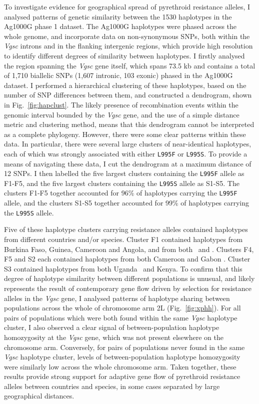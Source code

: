 \begin{refsection}
To investigate evidence for geographical spread of pyrethroid resistance alleles, I analysed patterns of genetic similarity between the 1530 haplotypes in the Ag1000G phase 1 dataset.
%
The Ag1000G haplotypes were phased across the whole genome, and incorporate data on non-synonymous SNPs, both within the \textit{Vgsc} introns and in the flanking intergenic regions, which provide high resolution to identify different degrees of similarity between haplotypes.
%
I firstly analysed the region spanning the \textit{Vgsc} gene itself, which spans 73.5 kb and contains a total of 1,710 biallelic SNPs (1,607 intronic, 103 exonic) phased in the Ag1000G dataset.
%
I performed a hierarchical clustering of these haplotypes, based on the number of SNP differences between them, and constructed a dendrogram, shown in Fig.~\ref{fig:hapclust}.
%
The likely presence of recombination events within the genomic interval bounded by the \textit{Vgsc} gene, and the use of a simple distance metric and clustering method, means that this dendrogram cannot be interpreted as a complete phylogeny.
%
However, there were some clear patterns within these data.
%
In particular, there were several large clusters of near-identical haplotypes, each of which was strongly associated with either \texttt{L995F} or \texttt{L995S}.
%
To provide a means of navigating these data, I cut the dendrogram at a maximum distance of 12 SNPs.
%
I then labelled the five largest clusters containing the \texttt{L995F} allele as F1-F5, and the five largest clusters containing the \texttt{L995S} allele as S1-S5.
%
The clusters F1-F5 together accounted for 96\% of haplotypes carrying the \texttt{L995F} allele, and the clusters S1-S5 together accounted for 99\% of haplotypes carrying the \texttt{L995S} allele.


Five of these haplotype clusters carrying resistance alleles contained haplotypes from different countries and/or species.
%
Cluster F1 contained haplotypes from Burkina Faso, Guinea, Cameroon and Angola, and from both \agam\ and \acol.
%
Clusters F4, F5 and S2 each contained haplotypes from both Cameroon and Gabon \agam.
%
Cluster S3 contained haplotypes from both Uganda \agam\ and Kenya.
%
To confirm that this degree of haplotype similarity between different populations is unusual, and likely represents the result of contemporary gene flow driven by selection for resistance alleles in the \textit{Vgsc} gene, I analysed patterns of haplotype sharing between populations across the whole of chromosome arm 2L (Fig.~\ref{fig:xphh}).
%
For all pairs of populations which were both found within the same \textit{Vgsc} haplotype cluster, I also observed a clear signal of between-population haplotype homozygosity at the \textit{Vgsc} gene, which was not present elsewhere on the chromosome arm.
%
Conversely, for pairs of populations never found in the same \textit{Vgsc} haplotype cluster, levels of between-population haplotype homozygosity were similarly low across the whole chromosome arm.
%
Taken together, these results provide strong support for adaptive gene flow of pyrethroid resistance alleles between countries and species, in some cases separated by large geographical distances.



\end{refsection}

